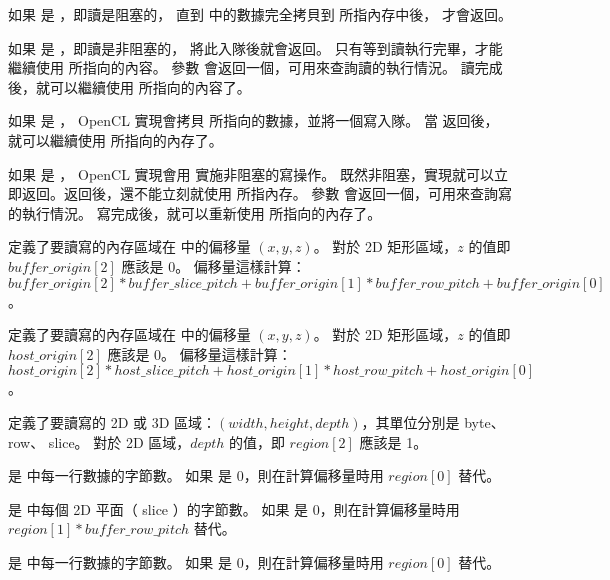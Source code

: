 如果  是 ，即讀是阻塞的，
直到  中的數據完全拷貝到  所指內存中後，  才會返回。

如果  是 ，即讀是非阻塞的，
 將此入隊後就會返回。
只有等到讀執行完畢，才能繼續使用  所指向的內容。
參數  會返回一個，可用來查詢讀的執行情況。
讀完成後，就可以繼續使用  所指向的內容了。

如果  是 ， OpenCL 實現會拷貝  所指向的數據，並將一個寫入隊。
當  返回後，就可以繼續使用  所指向的內存了。

如果  是 ， OpenCL 實現會用  實施非阻塞的寫操作。
既然非阻塞，實現就可以立即返回。返回後，還不能立刻就使用  所指內存。
參數  會返回一個，可用來查詢寫的執行情況。
寫完成後，就可以重新使用  所指向的內存了。

 定義了要讀寫的內存區域在  中的偏移量 $(x,y,z)$。
對於 2D 矩形區域，$z$ 的值即 $buffer\_origin[2]$ 應該是 0。
偏移量這樣計算：
$buffer\_origin[2] * buffer\_slice\_pitch + buffer\_origin[1] * buffer\_row\_pitch + buffer\_origin[0]$ 。

 定義了要讀寫的內存區域在  中的偏移量 $(x,y,z)$。
對於 2D 矩形區域，$z$ 的值即 $host\_origin[2]$ 應該是 0。
偏移量這樣計算：
$host\_origin[2] * host\_slice\_pitch + host\_origin[1] * host\_row\_pitch + host\_origin[0]$ 。

 定義了要讀寫的 2D 或 3D 區域：$(width,height,depth)$，其單位分別是 byte、 row、 slice。
對於 2D 區域，$depth$ 的值，即 $region[2]$ 應該是 1。

 是  中每一行數據的字節數。
如果  是 0，則在計算偏移量時用 $region[0]$ 替代。

 是  中每個 2D 平面（ slice ）的字節數。
如果  是 0，則在計算偏移量時用 $region[1] * buffer\_row\_pitch$ 替代。

 是  中每一行數據的字節數。
如果  是 0，則在計算偏移量時用 $region[0]$ 替代。

